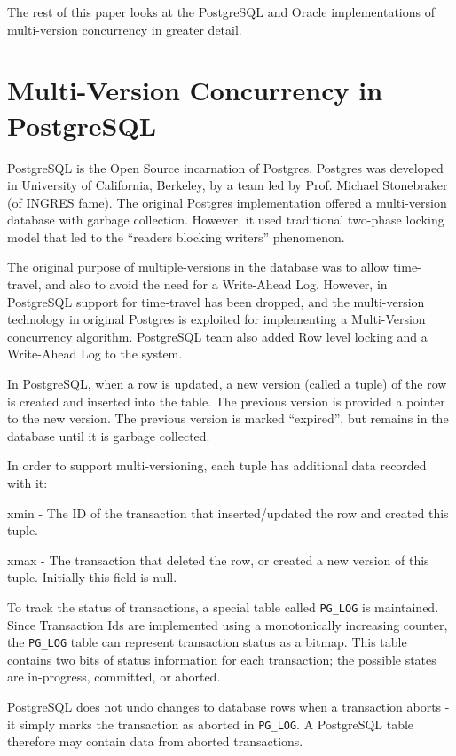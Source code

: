 \documentclass{article}
\begin{document}
The rest of this paper looks at the PostgreSQL and Oracle
implementations of multi-version concurrency in greater detail.

\section{Multi-Version Concurrency in PostgreSQL}

PostgreSQL is the Open Source incarnation of Postgres. Postgres was
developed in University of California, Berkeley, by a team led by
Prof. Michael Stonebraker (of INGRES fame). The original Postgres
implementation offered a multi-version database with garbage
collection. However, it used traditional two-phase locking model
that led to the ``readers blocking writers'' phenomenon.

The original purpose of multiple-versions in the database was to
allow time-travel, and also to avoid the need for a Write-Ahead Log.
However, in PostgreSQL support for time-travel has been dropped, and
the multi-version technology in original Postgres is exploited for
implementing a Multi-Version concurrency algorithm. PostgreSQL team
also added Row level locking and a Write-Ahead Log to the system.

In PostgreSQL, when a row is updated, a new version (called a tuple)
of the row is created and inserted into the table. The previous
version is provided a pointer to the new version. The previous
version is marked ``expired'', but remains in the database until it is
garbage collected.

In order to support multi-versioning, each tuple has additional data
recorded with it:

xmin - The ID of the transaction that inserted/updated the row and
created this tuple.

xmax - The transaction that deleted the row, or created a new
version of this tuple. Initially this field is null.

To track the status of transactions, a special table called
\verb|PG_LOG| is maintained. Since Transaction Ids are implemented
using a monotonically increasing counter, the \verb|PG_LOG| table
can represent transaction status as a bitmap. This table contains
two bits of status information for each transaction; the possible
states are in-progress, committed, or aborted.

PostgreSQL does not undo changes to database rows when a transaction
aborts - it simply marks the transaction as aborted in
\verb|PG_LOG|. A PostgreSQL table therefore may contain data from
aborted transactions.
\end{document}
